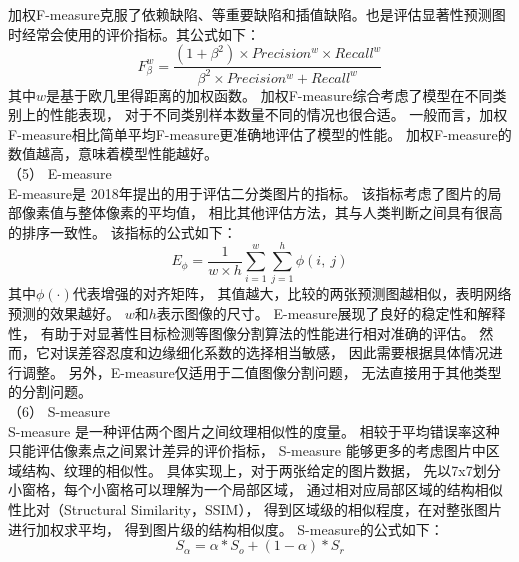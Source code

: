 %
%
%
%
\indent
%
%
加权F-measure克服了依赖缺陷、等重要缺陷和插值缺陷。也是评估显著性预测图时经常会使用的评价指标。其公式如下：
\begin{equation}
	F_{\beta}^{w} = \frac{\left ( 1 + \beta^{2} \right ) \times Precision^{w}  \times Recall^{w} }{\beta^{2} \times Precision^{w} + Recall^{w} } 
\end{equation}
%
%
其中$w$是基于欧几里得距离的加权函数。
加权F-measure综合考虑了模型在不同类别上的性能表现，
对于不同类别样本数量不同的情况也很合适。
一般而言，加权F-measure相比简单平均F-measure更准确地评估了模型的性能。
加权F-measure的数值越高，意味着模型性能越好。
\\
%
%
%
%
\indent
（5）
E-measure
\\
%
%
%
%
\indent
E-measure是
2018年提出的用于评估二分类图片的指标。
该指标考虑了图片的局部像素值与整体像素的平均值，
相比其他评估方法，其与人类判断之间具有很高的排序一致性。
该指标的公式如下：
%
%
\begin{equation}
	E_{\phi } = \frac{1}{w \times h} \sum_{i=1}^{w} \sum_{j=1}^{h} \phi\left ( i,~j \right ) 
\end{equation}
%
%
%
%
其中$\phi\left (\cdot \right ) $代表增强的对齐矩阵，
其值越大，比较的两张预测图越相似，表明网络预测的效果越好。
$w$和$h$表示图像的尺寸。
E-measure展现了良好的稳定性和解释性，
有助于对显著性目标检测等图像分割算法的性能进行相对准确的评估。
然而，它对误差容忍度和边缘细化系数的选择相当敏感，
因此需要根据具体情况进行调整。
另外，E-measure仅适用于二值图像分割问题，
无法直接用于其他类型的分割问题。
\\
%
%
%
%
\indent
（6）
S-measure
\\
%
%
%
%
\indent
S-measure 是一种评估两个图片之间纹理相似性的度量。
相较于平均错误率这种只能评估像素点之间累计差异的评价指标，
S-measure 能够更多的考虑图片中区域结构、纹理的相似性。
具体实现上，对于两张给定的图片数据，
先以7x7划分小窗格，每个小窗格可以理解为一个局部区域，
通过相对应局部区域的结构相似性比对（Structural Similarity，SSIM），
得到区域级的相似程度，在对整张图片进行加权求平均，
得到图片级的结构相似度。
S-measure的公式如下：
\begin{equation}
	S_{\alpha} = \alpha * S_{o} + \left ( 1 - \alpha  \right )*S_{r} 
\end{equation}
